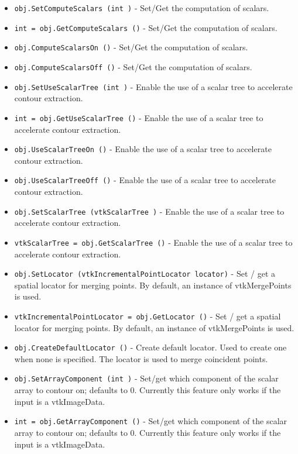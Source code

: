 \begin{itemize}
\item  \verb|obj.SetComputeScalars (int )| -  Set/Get the computation of scalars.

\item  \verb|int = obj.GetComputeScalars ()| -  Set/Get the computation of scalars.

\item  \verb|obj.ComputeScalarsOn ()| -  Set/Get the computation of scalars.

\item  \verb|obj.ComputeScalarsOff ()| -  Set/Get the computation of scalars.

\item  \verb|obj.SetUseScalarTree (int )| -  Enable the use of a scalar tree to accelerate contour extraction.

\item  \verb|int = obj.GetUseScalarTree ()| -  Enable the use of a scalar tree to accelerate contour extraction.

\item  \verb|obj.UseScalarTreeOn ()| -  Enable the use of a scalar tree to accelerate contour extraction.

\item  \verb|obj.UseScalarTreeOff ()| -  Enable the use of a scalar tree to accelerate contour extraction.

\item  \verb|obj.SetScalarTree (vtkScalarTree )| -  Enable the use of a scalar tree to accelerate contour extraction.

\item  \verb|vtkScalarTree = obj.GetScalarTree ()| -  Enable the use of a scalar tree to accelerate contour extraction.

\item  \verb|obj.SetLocator (vtkIncrementalPointLocator locator)| -  Set / get a spatial locator for merging points. By default, 
 an instance of vtkMergePoints is used.

\item  \verb|vtkIncrementalPointLocator = obj.GetLocator ()| -  Set / get a spatial locator for merging points. By default, 
 an instance of vtkMergePoints is used.

\item  \verb|obj.CreateDefaultLocator ()| -  Create default locator. Used to create one when none is
 specified. The locator is used to merge coincident points.

\item  \verb|obj.SetArrayComponent (int )| -  Set/get which component of the scalar array to contour on; defaults to 0.
 Currently this feature only works if the input is a vtkImageData.

\item  \verb|int = obj.GetArrayComponent ()| -  Set/get which component of the scalar array to contour on; defaults to 0.
 Currently this feature only works if the input is a vtkImageData.

\end{itemize}
